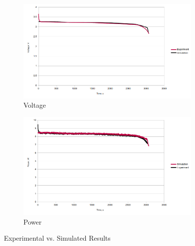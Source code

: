 \documentclass[conf]{new-aiaa}
\begin{document}
\begin{figure}[hbt!]
\centering
\begin{subfigure}[t]{0.45\textwidth}
\centering
\includegraphics[width=\textwidth]{Fig4a}
\caption{Voltage}
\label{fig:vala}
\end{subfigure}
\begin{subfigure}[t]{0.45\textwidth}
\centering
\includegraphics[width=\textwidth]{Fig4b}
\caption{Power}
\label{fig:valb}
\end{subfigure}
\caption{Experimental vs. Simulated Results}
\label{fig:val}
\end{figure}


\end{document}
